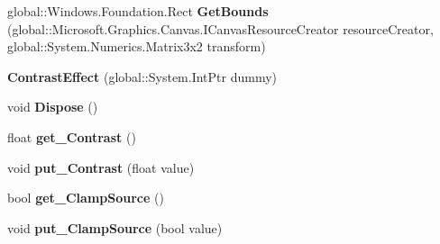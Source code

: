 \begin{DoxyCompactItemize}
\mbox{\label{class_microsoft_1_1_graphics_1_1_canvas_1_1_effects_1_1_contrast_effect_a7d7ad97626f28fed20870cf46f5910da}} 
global\+::\+Windows.\+Foundation.\+Rect {\bfseries Get\+Bounds} (global\+::\+Microsoft.\+Graphics.\+Canvas.\+I\+Canvas\+Resource\+Creator resource\+Creator, global\+::\+System.\+Numerics.\+Matrix3x2 transform)
\item 
\mbox{\label{class_microsoft_1_1_graphics_1_1_canvas_1_1_effects_1_1_contrast_effect_a8088c0c5b388e6b2ce8eeb3b08c3c7b0}} 
{\bfseries Contrast\+Effect} (global\+::\+System.\+Int\+Ptr dummy)
\item 
\mbox{\label{class_microsoft_1_1_graphics_1_1_canvas_1_1_effects_1_1_contrast_effect_a6f1bc711c2e2f43a2cdbf5f599a01945}} 
void {\bfseries Dispose} ()
\item 
\mbox{\label{class_microsoft_1_1_graphics_1_1_canvas_1_1_effects_1_1_contrast_effect_a140d08b77f0edc43a81972e67cc7bc4b}} 
float {\bfseries get\+\_\+\+Contrast} ()
\item 
\mbox{\label{class_microsoft_1_1_graphics_1_1_canvas_1_1_effects_1_1_contrast_effect_a23919ae56b418fe712468cc40f3e719a}} 
void {\bfseries put\+\_\+\+Contrast} (float value)
\item 
\mbox{\label{class_microsoft_1_1_graphics_1_1_canvas_1_1_effects_1_1_contrast_effect_adfdc196eeb8d4ab260ff8a02b91a232f}} 
bool {\bfseries get\+\_\+\+Clamp\+Source} ()
\item 
\mbox{\label{class_microsoft_1_1_graphics_1_1_canvas_1_1_effects_1_1_contrast_effect_aba9bdffcb03711ad9dcf51b730e58b8e}} 
void {\bfseries put\+\_\+\+Clamp\+Source} (bool value)
\item 
\mbox{\label{class_microsoft_1_1_graphics_1_1_canvas_1_1_effects_1_1_contrast_effect_a72dc5fce02408757eaba54af8a0d067c}} 

\end{DoxyCompactItemize}
